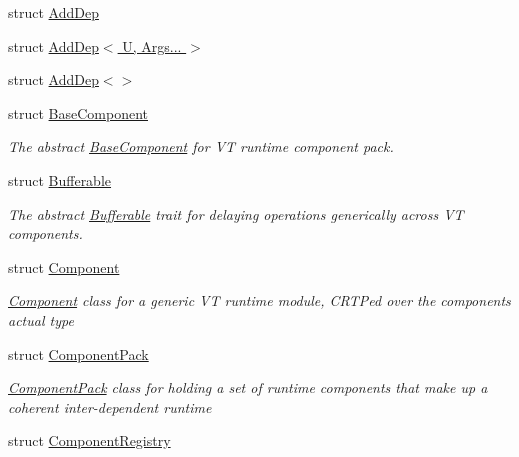 \begin{DoxyCompactItemize}
\item 
struct \hyperlink{structvt_1_1runtime_1_1component_1_1_add_dep}{Add\+Dep}
\item 
struct \hyperlink{structvt_1_1runtime_1_1component_1_1_add_dep_3_01_u_00_01_args_8_8_8_01_4}{Add\+Dep$<$ U, Args... $>$}
\item 
struct \hyperlink{structvt_1_1runtime_1_1component_1_1_add_dep_3_4}{Add\+Dep$<$$>$}
\item 
struct \hyperlink{structvt_1_1runtime_1_1component_1_1_base_component}{Base\+Component}
\begin{DoxyCompactList}\small\item\em The abstract {\ttfamily \hyperlink{structvt_1_1runtime_1_1component_1_1_base_component}{Base\+Component}} for VT runtime component pack. \end{DoxyCompactList}\item 
struct \hyperlink{structvt_1_1runtime_1_1component_1_1_bufferable}{Bufferable}
\begin{DoxyCompactList}\small\item\em The abstract {\ttfamily \hyperlink{structvt_1_1runtime_1_1component_1_1_bufferable}{Bufferable}} trait for delaying operations generically across VT components. \end{DoxyCompactList}\item 
struct \hyperlink{structvt_1_1runtime_1_1component_1_1_component}{Component}
\begin{DoxyCompactList}\small\item\em {\ttfamily \hyperlink{structvt_1_1runtime_1_1component_1_1_component}{Component}} class for a generic VT runtime module, C\+R\+TP\textquotesingle{}ed over the component\textquotesingle{}s actual type \end{DoxyCompactList}\item 
struct \hyperlink{structvt_1_1runtime_1_1component_1_1_component_pack}{Component\+Pack}
\begin{DoxyCompactList}\small\item\em {\ttfamily \hyperlink{structvt_1_1runtime_1_1component_1_1_component_pack}{Component\+Pack}} class for holding a set of runtime components that make up a coherent inter-\/dependent runtime \end{DoxyCompactList}\item 
struct \hyperlink{structvt_1_1runtime_1_1component_1_1_component_registry}{Component\+Registry}
\item 

\end{DoxyCompactItemize}
